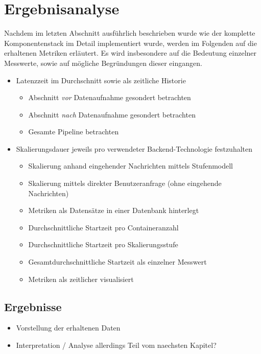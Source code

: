 \chapter{Ergebnisanalyse}


Nachdem im letzten Abschnitt ausführlich beschrieben wurde wie der komplette Komponentenstack im Detail implementiert wurde, werden im Folgenden auf die erhaltenen Metriken erläutert. Es wird insbesondere auf die Bedeutung einzelner Messwerte, sowie auf mögliche Begründungen dieser eingangen.


\begin{itemize}
  \item Latenzzeit im Durchschnitt sowie als zeitliche Historie
  \begin{itemize}
    \item Abschnitt \emph{vor} Datenaufnahme gesondert betrachten
    \item Abschnitt \emph{nach} Datenaufnahme gesondert betrachten
    \item Gesamte Pipeline betrachten
  \end{itemize}
  \item Skalierungsdauer jeweils pro verwendeter Backend-Technologie festzuhalten
  \begin{itemize}
    \item Skalierung anhand eingehender Nachrichten mittels Stufenmodell
    \item Skalierung mittels direkter Benutzeranfrage (ohne eingehende Nachrichten)
    \item Metriken als Datensätze in einer Datenbank hinterlegt
    \item Durchschnittliche Startzeit pro Containeranzahl 
    \item Durchschnittliche Startzeit pro Skalierungsstufe 
    \item Gesamtdurchschnittliche Startzeit als einzelner Messwert
    \item Metriken als zeitlicher visualisiert
  \end{itemize}
\end{itemize}




\section{Ergebnisse}
\begin{itemize}
  \item Vorstellung der erhaltenen Daten
  \item Interpretation / Analyse allerdings Teil vom naechsten Kapitel?
\end{itemize}

